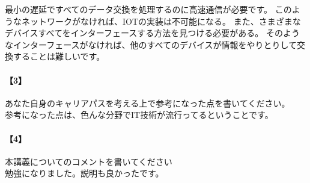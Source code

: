 \documentclass[20 pts]{article}
\begin{document}
最小の遅延ですべてのデータ交換を処理するのに高速通信が必要です。
このようなネットワークがなければ、IOTの実装は不可能になる。 
また、さまざまなデバイスすべてをインターフェースする方法を見つける必要がある。 
そのようなインターフェースがなければ、他のすべてのデバイスが情報をやりとりして交換することは難しいです。





\newpage
\paragraph{【3】}あなた自身のキャリアパスを考える上で参考になった点を書いてください。\\
参考になった点は、色んな分野でIT技術が流行ってるということです。



\paragraph{【4】}本講義についてのコメントを書いてください\\
勉強になりました。説明も良かったです。
\end{document}
